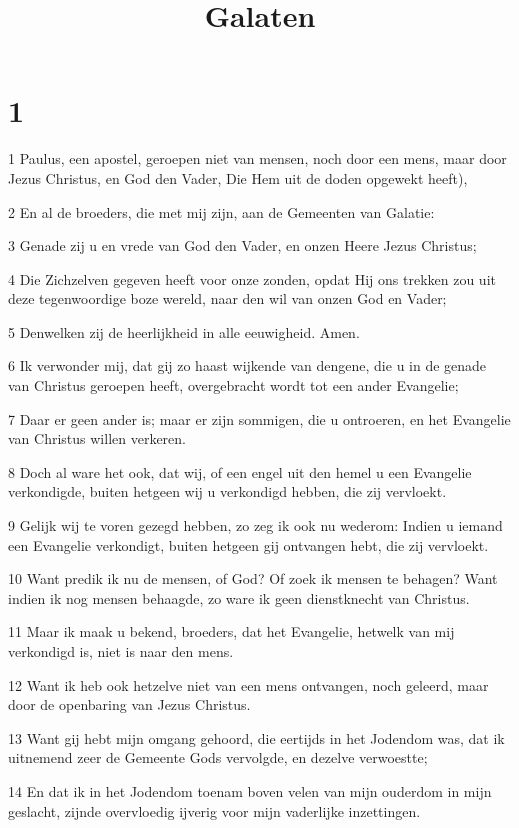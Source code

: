 

\title{Galaten}



\chapter{1}

\par 1 Paulus, een apostel, geroepen niet van mensen, noch door een mens, maar door Jezus Christus, en God den Vader, Die Hem uit de doden opgewekt heeft),
\par 2 En al de broeders, die met mij zijn, aan de Gemeenten van Galatie:
\par 3 Genade zij u en vrede van God den Vader, en onzen Heere Jezus Christus;
\par 4 Die Zichzelven gegeven heeft voor onze zonden, opdat Hij ons trekken zou uit deze tegenwoordige boze wereld, naar den wil van onzen God en Vader;
\par 5 Denwelken zij de heerlijkheid in alle eeuwigheid. Amen.
\par 6 Ik verwonder mij, dat gij zo haast wijkende van dengene, die u in de genade van Christus geroepen heeft, overgebracht wordt tot een ander Evangelie;
\par 7 Daar er geen ander is; maar er zijn sommigen, die u ontroeren, en het Evangelie van Christus willen verkeren.
\par 8 Doch al ware het ook, dat wij, of een engel uit den hemel u een Evangelie verkondigde, buiten hetgeen wij u verkondigd hebben, die zij vervloekt.
\par 9 Gelijk wij te voren gezegd hebben, zo zeg ik ook nu wederom: Indien u iemand een Evangelie verkondigt, buiten hetgeen gij ontvangen hebt, die zij vervloekt.
\par 10 Want predik ik nu de mensen, of God? Of zoek ik mensen te behagen? Want indien ik nog mensen behaagde, zo ware ik geen dienstknecht van Christus.
\par 11 Maar ik maak u bekend, broeders, dat het Evangelie, hetwelk van mij verkondigd is, niet is naar den mens.
\par 12 Want ik heb ook hetzelve niet van een mens ontvangen, noch geleerd, maar door de openbaring van Jezus Christus.
\par 13 Want gij hebt mijn omgang gehoord, die eertijds in het Jodendom was, dat ik uitnemend zeer de Gemeente Gods vervolgde, en dezelve verwoestte;
\par 14 En dat ik in het Jodendom toenam boven velen van mijn ouderdom in mijn geslacht, zijnde overvloedig ijverig voor mijn vaderlijke inzettingen.
